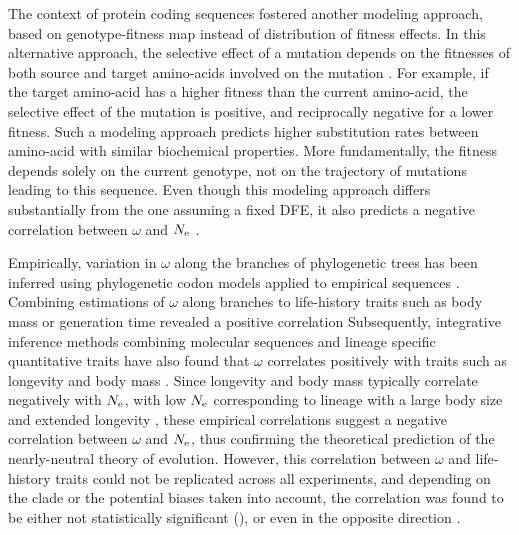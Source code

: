 \documentclass{article}
\begin{document}
	The context of protein coding sequences fostered another modeling approach, based on genotype-fitness map instead of distribution of fitness effects.
	In this alternative approach, the selective effect of a mutation depends on the fitnesses of both source and target amino-acids involved on the mutation \cite{Halpern1998, Rodrigue2010, Tamuri2012}.
	For example, if the target amino-acid has a higher fitness than the current amino-acid, the selective effect of the mutation is positive, and reciprocally negative for a lower fitness.
	Such a modeling approach predicts higher substitution rates between amino-acid with similar biochemical properties.
	More fundamentally, the fitness depends solely on the current genotype, not on the trajectory of mutations leading to this sequence.
	Even though this modeling approach differs substantially from the one assuming a fixed DFE, it also predicts a negative correlation between $\omega$ and $N_{\mathrm{e}}$ \cite{Spielman2015a, DosReis2015}.
	
	Empirically, variation in $\omega$ along the branches of phylogenetic trees has been inferred using phylogenetic codon models applied to empirical sequences \cite{Yang2001, Zhang2004}. 
	Combining estimations of $\omega$ along branches to life-history traits such as body mass or generation time revealed a positive correlation \cite{Popadin2007, Nikolaev2007}
	Subsequently, integrative inference methods combining molecular sequences and lineage specific quantitative traits have also found that $\omega$ correlates positively with traits such as longevity and body mass \cite{Lartillot2011, Figuet2017}.
	Since longevity and body mass typically correlate negatively with $N_{\mathrm{e}}$, with low $N_{\mathrm{e}}$ corresponding to lineage with a large body size and extended longevity \cite{Romiguier2014}, these empirical correlations suggest a negative correlation between $\omega$ and $N_{\mathrm{e}}$, thus confirming the theoretical prediction of the nearly-neutral theory of evolution.
	However, this correlation between $\omega$ and life-history traits could not be replicated across all experiments, and depending on the clade or the potential biases taken into account, the correlation was found to be either not statistically significant (\cite{Lartillot2012}), or even in the opposite direction \cite{Lanfear2010, Nabholz2013, Weber2014, Figuet2016}.
	
\end{document}
